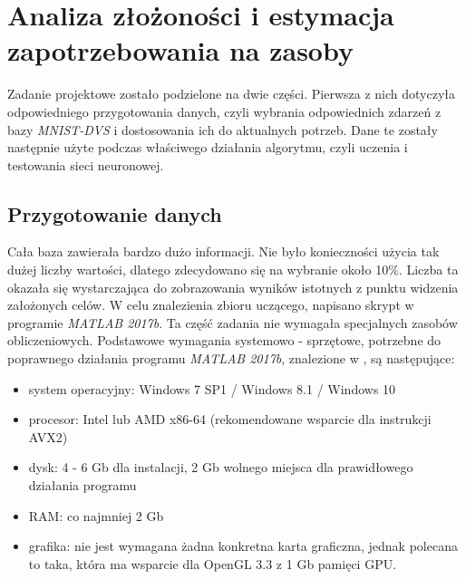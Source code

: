 \section{Analiza złożoności i estymacja zapotrzebowania na zasoby}
\label{sub:analiza}

Zadanie projektowe zostało podzielone na dwie części. Pierwsza z nich dotyczyła odpowiedniego przygotowania danych, czyli wybrania odpowiednich zdarzeń z bazy \textit{MNIST-DVS} i dostosowania ich do aktualnych potrzeb. Dane te zostały następnie użyte podczas właściwego działania algorytmu, czyli uczenia i testowania sieci neuronowej.

\subsection{Przygotowanie danych}
\label{sub:przygotowanie}

Cała baza \cite{baza} zawierała bardzo dużo informacji. Nie było konieczności użycia tak dużej liczby wartości, dlatego zdecydowano się na wybranie około 10\%. Liczba ta okazała się wystarczająca do zobrazowania wyników istotnych z punktu widzenia założonych celów.
W celu znalezienia zbioru uczącego, napisano skrypt w programie \textit{MATLAB 2017b}. Ta część zadania nie wymagała specjalnych zasobów obliczeniowych. Podstawowe wymagania systemowo - sprzętowe, potrzebne do poprawnego działania programu \textit{MATLAB 2017b}, znalezione w \cite{wymagania_Matlab}, są następujące:

\begin{itemize}
\item system operacyjny: Windows 7 SP1 / Windows 8.1 / Windows 10
\item procesor: Intel lub AMD x86-64 (rekomendowane wsparcie dla instrukcji AVX2)
\item dysk: 4 - 6 Gb dla instalacji, 2 Gb wolnego miejsca dla prawidłowego działania programu
\item RAM: co najmniej 2 Gb
\item grafika: nie jest wymagana żadna konkretna karta graficzna, jednak polecana to taka, która ma wsparcie dla OpenGL 3.3 z 1 Gb pamięci GPU.
\end{itemize}

